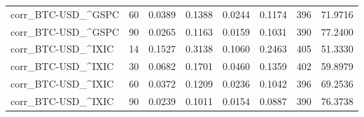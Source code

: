 \begin{table}[H]
\begin{tabular}{lrrrrrrr}
corr\_BTC-USD\_\textasciicircum GSPC & 60 & 0.0389 & 0.1388 & 0.0244 & 0.1174 & 396 & 71.9716 \\
corr\_BTC-USD\_\textasciicircum GSPC & 90 & 0.0265 & 0.1163 & 0.0159 & 0.1031 & 390 & 77.2400 \\
corr\_BTC-USD\_\textasciicircum IXIC & 14 & 0.1527 & 0.3138 & 0.1060 & 0.2463 & 405 & 51.3330 \\
corr\_BTC-USD\_\textasciicircum IXIC & 30 & 0.0682 & 0.1701 & 0.0460 & 0.1359 & 402 & 59.8979 \\
corr\_BTC-USD\_\textasciicircum IXIC & 60 & 0.0372 & 0.1209 & 0.0236 & 0.1042 & 396 & 69.2536 \\
corr\_BTC-USD\_\textasciicircum IXIC & 90 & 0.0239 & 0.1011 & 0.0154 & 0.0887 & 390 & 76.3738 \\
\bottomrule
\end{tabular}

\end{table}
